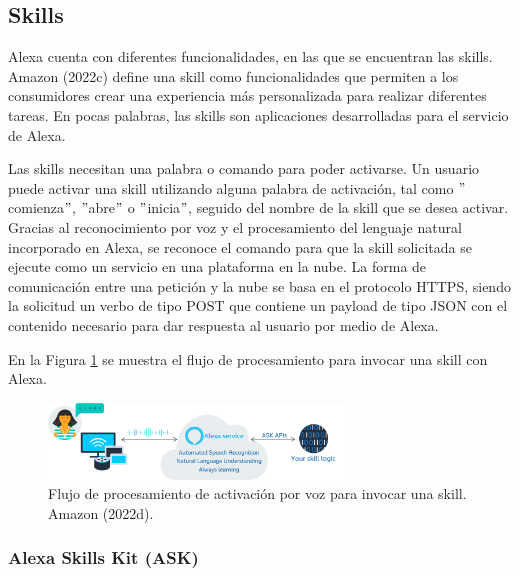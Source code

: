 
\subsection{Skills}
\label{SkillscapIV}

Alexa cuenta con diferentes funcionalidades, en las que se encuentran las skills. Amazon (2022c) define una skill como funcionalidades que permiten a los consumidores crear una experiencia más personalizada para realizar diferentes tareas. En pocas palabras, las skills son aplicaciones desarrolladas para el servicio de Alexa.

Las skills necesitan una palabra o comando para poder activarse. Un usuario puede activar una skill utilizando alguna palabra de activación, tal como $"$comienza$"$, $"$abre$"$ o $"$inicia$"$, seguido del nombre de la skill que se desea activar. Gracias al reconocimiento por voz y el procesamiento del lenguaje natural incorporado en Alexa, se reconoce el comando para que la skill solicitada se ejecute como un servicio en una plataforma en la nube. La forma de comunicación entre una petición y la nube se basa en el protocolo HTTPS, siendo la solicitud un verbo de tipo POST que contiene un payload de tipo JSON con el contenido necesario para dar respuesta al usuario por medio de Alexa.

En la Figura \ref{fig:41} se muestra el flujo de procesamiento para invocar una skill con Alexa.

\begin{figure}[H]
  \centering
  \includegraphics[width=0.70\textwidth]{Cap4/Figuras/ProcesoInvocacionSkill.png}
  \caption{Flujo de procesamiento de activación por voz para invocar una skill. Amazon (2022d).}
  \label{fig:41}
\end{figure}


\subsubsection{Alexa Skills Kit (ASK)}
\label{ASKcapIV}


